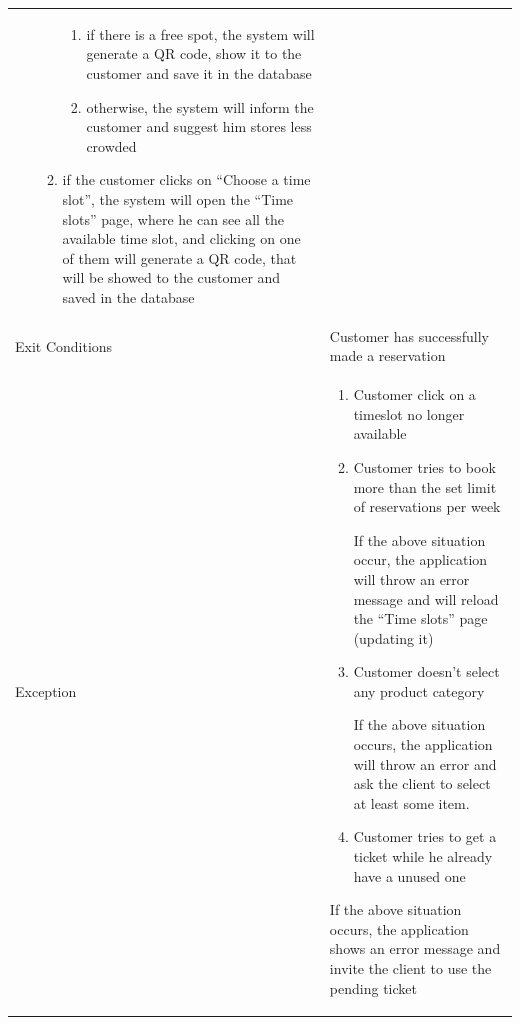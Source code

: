 \documentclass{article}
\newcommand\xrowht[2][0]
{\addstackgap[.5\dimexpr#2\relax]{\vphantom{#1}}}
\begin{document}
\begin{center}
\begin{adjustwidth}{-1.5cm}{}
\begin{tabular}[h!]{|m{7.5em}|m{27.5em}|}
\begin{enumerate}
\begin{enumerate}
								\begin{enumerate}
									
									\itemsep0em
									\item if there is a free spot, the system will generate a
									QR code, show it to the customer and save it in the
									database
									\item otherwise, the system will inform the customer and suggest him stores less crowded
									
								\end{enumerate}
								
								\item if the customer clicks on “Choose a time slot”, the system will open the “Time slots” page, where he can see all the available time slot, and clicking on one of them will generate a QR code, that will be showed to the customer and saved in the database
								
							\end{enumerate}
							
						\end{enumerate}\\
						\xrowht{5pt}
						Exit Conditions & Customer has successfully made a reservation\\
						\xrowht{5pt}
						Exception & \begin{enumerate}
							
							\itemsep-0.25em
							\item Customer click on a timeslot no longer available
							\item Customer tries to book more than the set limit of reservations per week
							
							If the above situation occur, the application will throw an error message and will reload the “Time slots” page (updating it)
							
							\item Customer doesn’t select any product category
							
							If the above situation occurs, the application will throw an error and ask the client to select at least some item.
							
							\item Customer tries to get a ticket while he already have a unused one 
							
						\end{enumerate}
						If the above situation occurs, the application shows an error message and invite the client to use the pending ticket\\		
						\hline
						
					\end{tabular}
					\end{adjustwidth}
					
				\end{center}
			
\end{document}
